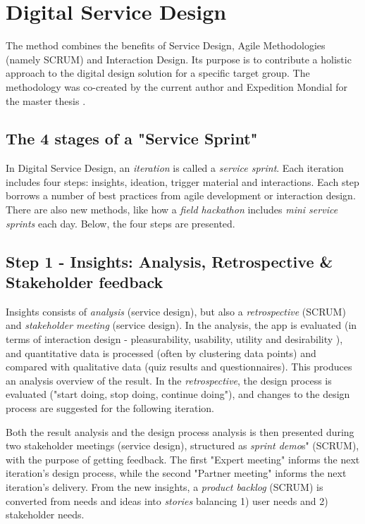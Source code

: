 \section{Digital Service Design} \label{digital-service-design}

The method combines the benefits of Service Design, Agile Methodologies (namely SCRUM) and Interaction Design. Its purpose is to contribute a holistic approach to the digital design solution for a specific target group. The methodology was co-created by the current author and Expedition Mondial for the master thesis \citep{nissar}.

\subsection{The 4 stages of a "Service Sprint"}
In Digital Service Design, an \textit{iteration} is called a \textit{service sprint}. Each iteration includes four steps: insights, ideation, trigger material and interactions. Each step borrows a number of best practices from agile development or interaction design. There are also new methods, like how a \textit{field hackathon} includes \textit{mini service sprints} each day. Below, the four steps are presented.

\subsection{Step 1 - Insights: Analysis, Retrospective \& Stakeholder feedback}
  Insights consists of \textit{analysis} (service design), but also a \textit{retrospective} (SCRUM) and \textit{stakeholder meeting} (service design). In the analysis, the app is evaluated (in terms of interaction design - pleasurability, usability, utility and desirability \citep{clatworthy}), and quantitative data is processed (often by clustering data points) and compared with qualitative data (quiz results and questionnaires). This produces an analysis overview of the result. In the \textit{retrospective}, the design process is evaluated ("start doing, stop doing, continue doing"), and changes to the design process are suggested for the following iteration.

    Both the result analysis and the design process analysis is then presented during two stakeholder meetings (service design), structured as \textit{sprint demo}s" (SCRUM), with the purpose of getting feedback. The first "Expert meeting" informs the next iteration's design process, while the second "Partner meeting" informs the next iteration's delivery. From the new insights, a \textit{product backlog} (SCRUM) is converted from needs and ideas into \textit{stories} balancing 1) user needs and 2) stakeholder needs.

